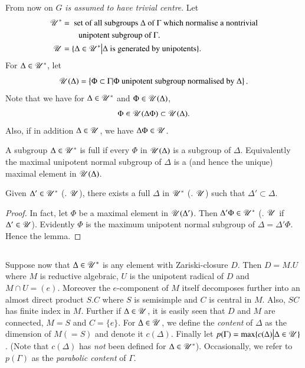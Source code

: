 \subsection{}\label{art9-subsec2.12}
From now on $G$ \textit{is assumed to have trivial centre}. Let
\begin{align*}
\mathscr{U}^\ast & = \text{ set of all subgroups $\Delta$ of $\Gamma$ which normalise a nontrivial}\\
& \text{\qquad  unipotent subgroup of $\Gamma$.}\\
\mathscr{U} & =  \{\Delta \in \mathscr{U}^\ast \big| \Delta \text{ is generated by unipotents} \}.
\end{align*}
For $\Delta \in \mathscr{U}^\ast$, let
$$
\mathscr{U} (\Delta) = \left\{\Phi \subset \Gamma | \Phi \text{ unipotent subgroup normalised by $\Delta$} \right\}.
$$\pageoriginale
Note that we have for $\Delta \in \mathscr{U}^\ast$ and $\Phi \in \mathscr{U} (\Delta)$,
$$
\Phi \in \mathscr{U} (\Delta \Phi) \subset \mathscr{U} (\Delta).
$$
Also, if in addition $\Delta \in \mathscr{U}$, we have $\Delta \Phi \in \mathscr{U}$.   

\setcounter{definition}{12}
\begin{definition}\label{art9-def2.13}
A subgroup $\Delta \in \mathscr{U}^\ast$ is full if every $\Phi$ in $\mathscr{U}(\Delta)$ is a subgroup of $\Delta$. Equivalently the maximal unipotent normal subgroup  of $\Delta$ is a (and hence the {\rm unique}) maximal element in $\mathscr{U} (\Delta)$. 
\end{definition}

\begin{lemma}\label{art9-lem2.14}
Given $\Delta' \in \mathscr{U}^\ast$ (\resp. $\mathscr{U}$), there exists a full $\Delta$ in $\mathscr{U}^\ast$ (\resp. $\mathscr{U}$) such that $\Delta' \subset \Delta$.
\end{lemma}

\begin{proof}
In fact, let $\Phi$ be a maximal element in $\mathscr{U}(\Delta')$. Then $\Delta' \Phi \in \mathscr{U}^\ast$ (\resp. $\mathscr{U}$ if $\Delta' \in \mathscr{U}$). Evidently $\Phi$ is the maximum unipotent normal subgroup of $\Delta = \Delta' \Phi$. Hence the lemma. 
\end{proof}

\setcounter{subsection}{14}
\subsection{}\label{art9-subsec2.15}
Suppose now that $\Delta \in \mathscr{U}^\ast$ is any element with Zariski-closure $D$. Then $D = M. U$ where $M$ is reductive algebraic, $U$ is the unipotent radical of $D$ and $M \cap U = (e)$. Moreover the $e$-component of $M$ itself decomposes further into an almost direct product $S.C$ where $S$ is semisimple and $C$ is central in $M$. Also, $SC$ has finite index in $M$. Further if $\Delta \in \mathscr{U}$, it is easily seen that $D$ and $M$ are connected, $M=S$ and $C = \{e\}$. For $\Delta \in \mathscr{U}$, we define the \textit{content} of $\Delta$ as the dimension of $M(=S)$ and denote it $c(\Delta)$. Finally let $p(\Gamma) = \max \{c (\Delta) \big| \Delta \in \mathscr{U}\}$. (Note that $c(\Delta)$ has \textit{not} been defined for $\Delta \in \mathscr{U}^\ast$). Occasionally, we refer to $p(\Gamma)$ as the \textit{parabolic content} of $\Gamma$.

